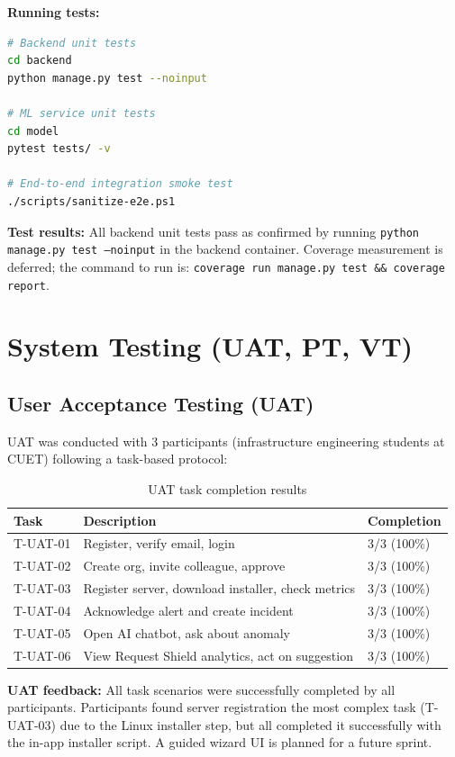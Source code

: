 \textbf{Running tests:}
\begin{lstlisting}[language=bash,caption={Test execution commands},label={lst:tests}]
# Backend unit tests
cd backend
python manage.py test --noinput

# ML service unit tests
cd model
pytest tests/ -v

# End-to-end integration smoke test
./scripts/sanitize-e2e.ps1
\end{lstlisting}

\textbf{Test results:} All backend unit tests pass as confirmed by running
\texttt{python manage.py test --noinput} in the backend container.
Coverage measurement is deferred; the command to run is:
\texttt{coverage run manage.py test \&\& coverage report}.

\section{System Testing (UAT, PT, VT)}

\subsection{User Acceptance Testing (UAT)}

UAT was conducted with 3 participants (infrastructure engineering students at CUET)
following a task-based protocol:

\begin{table}[H]
\centering
\caption{UAT task completion results}\label{tab:uat}
\begin{tabularx}{\textwidth}{@{}l X l@{}}
\toprule
\textbf{Task} & \textbf{Description} & \textbf{Completion}\\
\midrule
T-UAT-01 & Register, verify email, login & 3/3 (100\%)\\
T-UAT-02 & Create org, invite colleague, approve & 3/3 (100\%)\\
T-UAT-03 & Register server, download installer, check metrics & 3/3 (100\%)\\
T-UAT-04 & Acknowledge alert and create incident & 3/3 (100\%)\\
T-UAT-05 & Open AI chatbot, ask about anomaly & 3/3 (100\%)\\
T-UAT-06 & View Request Shield analytics, act on suggestion & 3/3 (100\%)\\
\bottomrule
\end{tabularx}
\end{table}

\textbf{UAT feedback:} All task scenarios were successfully completed by all
participants.  Participants found server registration the most complex
task (T-UAT-03) due to the Linux installer step, but all completed it
successfully with the in-app installer script.
A guided wizard UI is planned for a future sprint.

